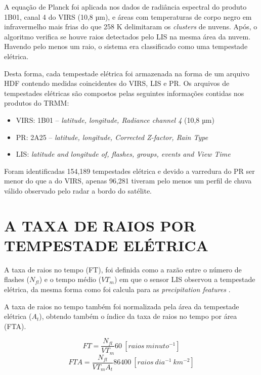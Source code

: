 A equação de Planck foi aplicada nos dados de radiância espectral do produto 1B01, canal 4 do VIRS (10,8 µm), e áreas com temperaturas de corpo negro em infravermelho mais frias do que 258 K delimitaram os \textit{clusters} de nuvens. Após, o algoritmo verifica se houve raios detectados pelo LIS na mesma área da nuvem. Havendo pelo menos um raio, o sistema era classificado como uma tempestade elétrica. 

Desta forma, cada tempestade elétrica foi armazenada na forma de um arquivo HDF contendo medidas coincidentes do VIRS, LIS e PR. Os arquivos de tempestades elétricas são compostos pelas seguintes informações contidas nos produtos do TRMM:

\begin{itemize}
\item VIRS: 1B01 -- \textit{latitude, longitude, Radiance channel 4} (10,8 µm)
\item PR: 2A25 -- \textit{latitude, longitude, Corrected Z-factor, Rain Type} 
\item LIS: \textit{latitude and longitude of, flashes, groups, events and View Time}  
\end{itemize} 

Foram identificadas 154,189 tempestades elétrica e devido a varredura do PR ser menor do que a do VIRS, apenas 96,281 tiveram pelo menos um perfil de chuva válido observado pelo radar a bordo do satélite.


\section{A TAXA DE RAIOS POR TEMPESTADE ELÉTRICA}
\label{metodoFtaFt}
A taxa de raios no tempo (FT), foi definida como a razão entre o número de flashes ($N_{fl}$) e o tempo médio ($VT_m$) em que o sensor LIS observou a tempestade elétrica, da mesma forma como foi calcula para as \textit{precipitation features} \cite{cecil2005, Nesbitt2000}. 



A taxa de raios no tempo também foi normalizada pela área da tempestade elétrica ($A_t$), obtendo também o índice da taxa de raios no tempo por área (FTA). 

\begin{equation}
FT = \frac{N_{fl} }{VT_m} 60 ~[raios~minuto^{-1}]  
\label{eqFT}  
\end{equation}
\begin{equation}
FTA = \frac{N_{fl} }{VT_m A_t } 86400 ~[raios~dia^{-1}~km^{-2}]
\label{eqFTA}
\end{equation}

